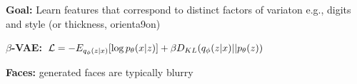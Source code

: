 \textbf{Goal:} Learn features that correspond to distinct factors of variaton e.g., digits and style (or thickness, orienta9on)

\textbf{$\beta$-VAE:} $\mathcal{L} = -E_{q_\phi(z|x)}[\log p_\theta(x|z)] + \beta D_{KL}(q_\phi(z|x) || p_\theta(z))$\\

\textbf{Faces:} generated faces are typically blurry\\












